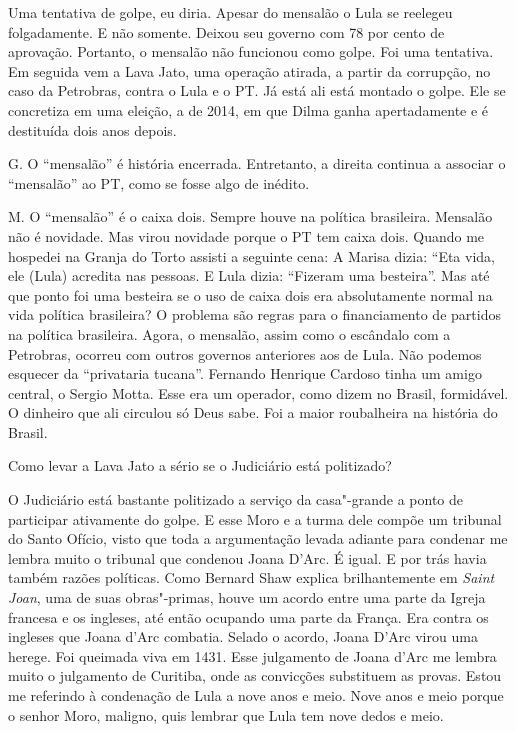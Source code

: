 \falaM Uma tentativa de golpe, eu diria. Apesar do mensalão o Lula se
reelegeu folgadamente. E não somente. Deixou seu governo com 78 por
cento de aprovação. Portanto, o mensalão não funcionou como golpe. Foi
uma tentativa. Em seguida vem a Lava Jato, uma operação atirada, a
partir da corrupção, no caso da Petrobras, contra o Lula e o PT. Já está
ali está montado o golpe. Ele se concretiza em uma eleição, a de 2014,
em que Dilma ganha apertadamente e é destituída dois anos depois.

G. O ``mensalão'' é história encerrada. Entretanto, a direita continua a
associar o ``mensalão'' ao PT, como se fosse algo de inédito.

M. O ``mensalão'' é o caixa dois. Sempre houve na política brasileira.
Mensalão não é novidade. Mas virou novidade porque o PT tem caixa dois.
Quando me hospedei na Granja do Torto assisti a seguinte cena: A Marisa
dizia: ``Eta vida, ele (Lula) acredita nas pessoas. E Lula dizia:
``Fizeram uma besteira''. Mas até que ponto foi uma besteira se o uso de
caixa dois era absolutamente normal na vida política brasileira? O
problema são regras para o financiamento de partidos na política
brasileira. Agora, o mensalão, assim como o escândalo com a Petrobras,
ocorreu com outros governos anteriores aos de Lula. Não podemos esquecer
da ``privataria tucana''. Fernando Henrique Cardoso tinha um amigo
central, o Sergio Motta. Esse era um operador, como dizem no Brasil,
formidável. O dinheiro que ali circulou só Deus sabe. Foi a maior
roubalheira na história do Brasil.

\falaG Como levar a Lava Jato a sério se o Judiciário está politizado?

\falaM O Judiciário está bastante politizado a serviço da casa"-grande a
ponto de participar ativamente do golpe. E esse Moro e a turma dele
compõe um tribunal do Santo Ofício, visto que toda a argumentação levada
adiante para condenar me lembra muito o tribunal que condenou Joana
D'Arc. É igual. E por trás havia também razões políticas. Como Bernard
Shaw explica brilhantemente em \emph{Saint Joan}, uma de suas
obras"-primas, houve um acordo entre uma parte da Igreja francesa e os
ingleses, até então ocupando uma parte da França. Era contra os ingleses
que Joana d'Arc combatia. Selado o acordo, Joana D'Arc virou uma herege.
Foi queimada viva em 1431. Esse julgamento de Joana d'Arc me lembra
muito o julgamento de Curitiba, onde as convicções substituem as provas.
Estou me referindo à condenação de Lula a nove anos e meio. Nove anos e
meio porque o senhor Moro, maligno, quis lembrar que Lula tem nove dedos
e meio.

